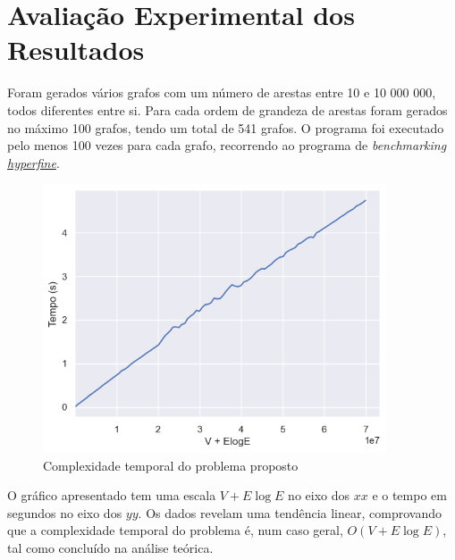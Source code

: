 \documentclass[12pt,a4paper]{article}
\begin{document}
  \section{Avaliação Experimental dos Resultados}

  Foram gerados vários grafos com um número de arestas entre 10 e 10 000 000, todos diferentes entre si. Para cada ordem de grandeza de arestas foram gerados no máximo 100 grafos, tendo um total de 541 grafos.
  O programa foi executado pelo menos 100 vezes para cada grafo, recorrendo ao programa de \textit{benchmarking} \href{https://github.com/sharkdp/hyperfine}{\textit{hyperfine}}.

  \begin{figure}[h]
    \centering
    \includegraphics[width=4in]{report.png}
    \caption{Complexidade temporal do problema proposto}
  \end{figure}

  O gráfico apresentado tem uma escala $V + E \log E$ no eixo dos $xx$ e o tempo em segundos no eixo dos $yy$.
  Os dados revelam uma tendência linear, comprovando que a complexidade temporal do problema é, num caso geral, $O(V + E\log E)$, tal como concluído na análise teórica.

  \printbibliography[title={Referência}]
\end{document}
